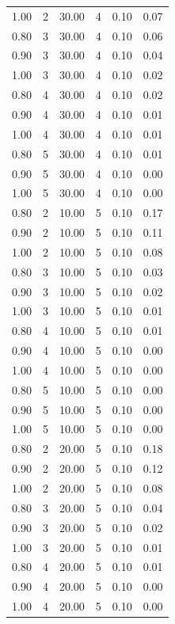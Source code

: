 \documentclass[12pt]{article}
\begin{document}
{{{{\begin{longtable}{cccccc}
  1.00 &   2 & 30.00 &   4 & 0.10 & 0.07 \\ 
  0.80 &   3 & 30.00 &   4 & 0.10 & 0.06 \\ 
  0.90 &   3 & 30.00 &   4 & 0.10 & 0.04 \\ 
  1.00 &   3 & 30.00 &   4 & 0.10 & 0.02 \\ 
  0.80 &   4 & 30.00 &   4 & 0.10 & 0.02 \\ 
  0.90 &   4 & 30.00 &   4 & 0.10 & 0.01 \\ 
  1.00 &   4 & 30.00 &   4 & 0.10 & 0.01 \\ 
  0.80 &   5 & 30.00 &   4 & 0.10 & 0.01 \\ 
  0.90 &   5 & 30.00 &   4 & 0.10 & 0.00 \\ 
  1.00 &   5 & 30.00 &   4 & 0.10 & 0.00 \\ 
  0.80 &   2 & 10.00 &   5 & 0.10 & 0.17 \\ 
  0.90 &   2 & 10.00 &   5 & 0.10 & 0.11 \\ 
  1.00 &   2 & 10.00 &   5 & 0.10 & 0.08 \\ 
  0.80 &   3 & 10.00 &   5 & 0.10 & 0.03 \\ 
  0.90 &   3 & 10.00 &   5 & 0.10 & 0.02 \\ 
  1.00 &   3 & 10.00 &   5 & 0.10 & 0.01 \\ 
  0.80 &   4 & 10.00 &   5 & 0.10 & 0.01 \\ 
  0.90 &   4 & 10.00 &   5 & 0.10 & 0.00 \\ 
  1.00 &   4 & 10.00 &   5 & 0.10 & 0.00 \\ 
  0.80 &   5 & 10.00 &   5 & 0.10 & 0.00 \\ 
  0.90 &   5 & 10.00 &   5 & 0.10 & 0.00 \\ 
  1.00 &   5 & 10.00 &   5 & 0.10 & 0.00 \\ 
  0.80 &   2 & 20.00 &   5 & 0.10 & 0.18 \\ 
  0.90 &   2 & 20.00 &   5 & 0.10 & 0.12 \\ 
  1.00 &   2 & 20.00 &   5 & 0.10 & 0.08 \\ 
  0.80 &   3 & 20.00 &   5 & 0.10 & 0.04 \\ 
  0.90 &   3 & 20.00 &   5 & 0.10 & 0.02 \\ 
  1.00 &   3 & 20.00 &   5 & 0.10 & 0.01 \\ 
  0.80 &   4 & 20.00 &   5 & 0.10 & 0.01 \\ 
  0.90 &   4 & 20.00 &   5 & 0.10 & 0.00 \\ 
  1.00 &   4 & 20.00 &   5 & 0.10 & 0.00 \\ 

\end{longtable}}}}}
\end{document}
